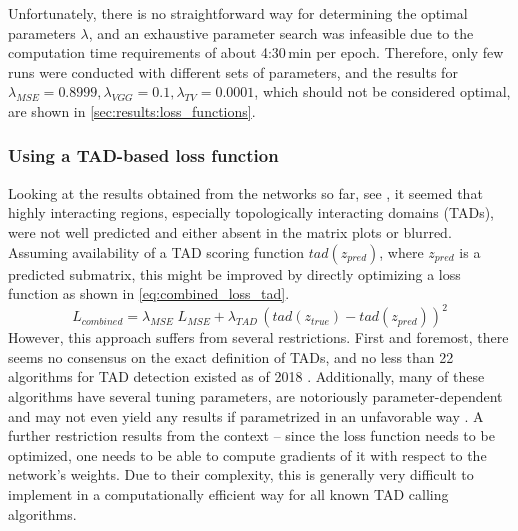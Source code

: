 Unfortunately, there is no straightforward way for determining the optimal parameters $\lambda$,
and an exhaustive parameter search was infeasible due to the computation time requirements of about 4:30\,min per epoch.
Therefore, only few runs were conducted with different sets of parameters,
and the results for $\lambda_\mathit{MSE} = 0.8999, \lambda_\mathit{VGG}=0.1, \lambda_\mathit{TV}=0.0001$,
which should not be considered optimal, are shown in \cref{sec:results:loss_functions}.

\subsubsection{Using a TAD-based loss function}
Looking at the results obtained from the networks so far, see \xxx, it seemed that highly interacting regions,
especially topologically interacting domains (TADs), were not well predicted and either absent
in the matrix plots or blurred.
Assuming availability of a TAD scoring function $\mathit{tad}(z_\mathit{pred})$, where $z_\mathit{pred}$ is a predicted submatrix,
this might be improved by directly optimizing a loss function as shown in \cref{eq:combined_loss_tad}.
\begin{equation}
 L_\mathit{combined} = \lambda_\mathit{MSE}\;L_\mathit{MSE} + \lambda_\mathit{TAD} \, (\mathit{tad}(z_\mathit{true}) - \mathit{tad}(z_\mathit{pred}))^2 \label{eq:combined_loss_tad}
\end{equation}
However, this approach suffers from several restrictions.
First and foremost, there seems no consensus on the exact definition of TADs, 
and no less than 22 algorithms for TAD detection existed as of 2018 \cite{Dali2017,Zufferey2018}.
Additionally, many of these algorithms have several tuning parameters, are notoriously parameter-dependent
and may not even yield any results if parametrized in an unfavorable way \cite{Zufferey2018}. 
A further restriction results from the context -- since the loss function needs to be optimized,
one needs to be able to compute gradients of it with respect to the network's weights.
Due to their complexity, this is generally very difficult to implement in a computationally efficient way for all known TAD calling algorithms.

